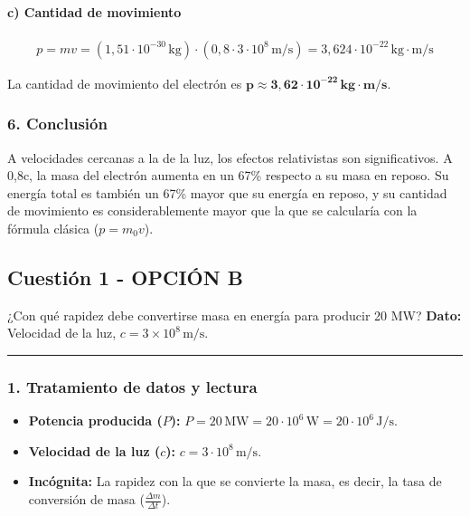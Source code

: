 \paragraph{c) Cantidad de movimiento}
\begin{gather}
    p = m v = (1,51 \cdot 10^{-30} \, \text{kg}) \cdot (0,8 \cdot 3 \cdot 10^8 \, \text{m/s}) = 3,624 \cdot 10^{-22} \, \text{kg}\cdot\text{m/s}
\end{gather}
\begin{cajaresultado}
    La cantidad de movimiento del electrón es $\boldsymbol{p \approx 3,62 \cdot 10^{-22} \, \textbf{kg}\cdot\textbf{m/s}}$.
\end{cajaresultado}

\subsubsection*{6. Conclusión}
\begin{cajaconclusion}
A velocidades cercanas a la de la luz, los efectos relativistas son significativos. A 0,8c, la masa del electrón aumenta en un 67\% respecto a su masa en reposo. Su energía total es también un 67\% mayor que su energía en reposo, y su cantidad de movimiento es considerablemente mayor que la que se calcularía con la fórmula clásica ($p=m_0 v$).
\end{cajaconclusion}

\newpage

\subsection{Cuestión 1 - OPCIÓN B}
\label{subsec:5B_2000_jun_ord}

\begin{cajaenunciado}
¿Con qué rapidez debe convertirse masa en energía para producir 20 MW?
\textbf{Dato:} Velocidad de la luz, $c=3\times10^{8}\,\text{m/s}$.
\end{cajaenunciado}
\hrule

\subsubsection*{1. Tratamiento de datos y lectura}
\begin{itemize}
    \item \textbf{Potencia producida ($P$):} $P = 20 \, \text{MW} = 20 \cdot 10^6 \, \text{W} = 20 \cdot 10^6 \, \text{J/s}$.
    \item \textbf{Velocidad de la luz ($c$):} $c = 3 \cdot 10^8 \, \text{m/s}$.
    \item \textbf{Incógnita:} La rapidez con la que se convierte la masa, es decir, la tasa de conversión de masa ($\frac{\Delta m}{\Delta t}$).
\end{itemize}

